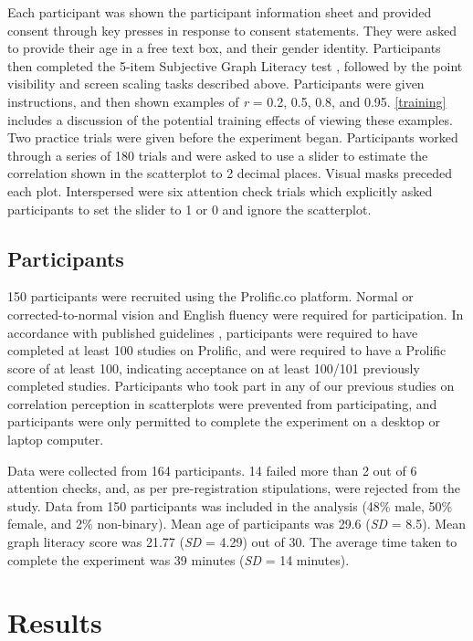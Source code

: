 \documentclass{vgtc}                          %
\begin{document}
Each participant was shown the participant information sheet and provided
consent through key presses in response to consent statements. They were asked
to provide their age in a free text box, and their gender identity. Participants
then completed the 5-item Subjective Graph Literacy test \cite{garcia_2016},
followed by the point visibility and screen scaling tasks described above.
Participants were given instructions, and then shown examples of \emph{r} = 0.2, 0.5, 0.8, and
0.95. \autoref{training} includes a discussion of the potential training effects of
viewing these examples. Two practice trials were given before the experiment began.
Participants worked through a series of 180 trials
and were asked to use a slider to estimate the correlation shown in
the scatterplot to 2 decimal places. Visual masks preceded each plot. Interspersed were six attention
check trials which explicitly asked participants to set the slider to 1 or 0 and ignore the scatterplot.

\hypertarget{participants}{%
\subsection{Participants}\label{participants}}

150 participants were recruited using the Prolific.co platform. Normal or
corrected-to-normal vision and English fluency were required for participation. In
accordance with published guidelines \cite{peer_2021},
participants were required to have completed at least 100 studies on Prolific, and were
required to have a Prolific score of at least 100, indicating acceptance on at least
100/101 previously completed studies. Participants who took part in any of our
previous studies on correlation perception in scatterplots
were prevented from participating, and participants were only
permitted to complete the experiment on a desktop or laptop computer.

Data were collected from 164 participants. 14 failed more than 2 out of 6 attention
checks, and, as per pre-registration stipulations, were rejected from the study. Data
from 150 participants was included in the analysis (48\%
male, 50\% female, and 2\%
non-binary). Mean age of participants was 29.6
(\emph{SD} = 8.5). Mean graph literacy score was 21.77
(\emph{SD} = 4.29) out of 30. The average time taken to complete
the experiment was 39 minutes (\emph{SD} = 14 minutes).

\hypertarget{results}{%
\section{Results}\label{results}}
\end{document}
